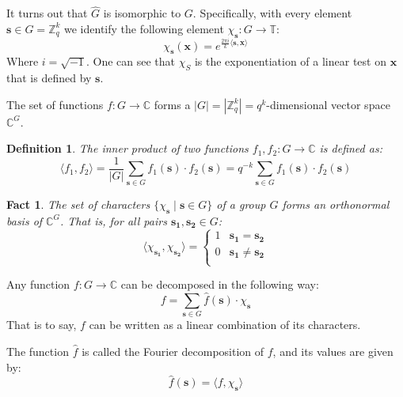 \documentclass[12pt]{article}
\newtheorem{definition}{Definition}[section]
\newtheorem{fact}[theorem]{Fact}
\newcommand{\C}{\mathbb{C}}
\renewcommand{\T}{\mathbb{T}}
\newcommand{\Z}{\mathbb{Z}}
\newcommand{\abs}[1]{\left| #1 \right|}
\renewcommand{\vec}[1]{\bm{#1}}
\begin{document}
	It turns out that $\hat{G}$ is isomorphic to $G$.
	Specifically, with every element $\vec{s} \in G = \Z_q^k$ we identify the following element $\chi_{\vec{s}} : G \rightarrow \T$:
	\begin{equation*}
		\chi_{\vec{s}}(\vec{x}) = e^{ \frac{2 \pi i}{k} \langle \vec{s}, \vec{x} \rangle }
	\end{equation*}
	Where $i = \sqrt{-1}$.
	One can see that $\chi_S$ is the exponentiation of a linear test on $\vec{x}$ that is defined by $\vec{s}$.
	
	The set of functions $f : G \rightarrow \C$ forms a $\abs{G} = \abs{\Z_q^k} = q^k$-dimensional vector space $\C^G$.
	\begin{definition}
		The \emph{inner product} of two functions $f_1, f_2 : G \rightarrow \C$ is defined as:
		\begin{equation*}
			\langle f_1, f_2 \rangle
			= \frac{1}{\abs{G}} \sum_{\vec{s} \in G} f_1(\vec{s}) \cdot f_2(\vec{s})
			= q^{-k} \sum_{\vec{s} \in G} f_1(\vec{s}) \cdot f_2(\vec{s})
		\end{equation*}
	\end{definition}
	
	\begin{fact}
		The set of characters $\{\chi_{\vec{s}} \mid \vec{s} \in G\}$ of a group $G$ forms an orthonormal basis of $\C^G$.
		That is, for all pairs $\vec{s_1}, \vec{s_2} \in G$:
		\begin{equation*}
			\langle \chi_{\vec{s_1}}, \chi_{\vec{s_2}} \rangle =
			\begin{cases}
				1 & \vec{s_1} = \vec{s_2} \\
				0 & \vec{s_1} \neq \vec{s_2} \\
			\end{cases}
		\end{equation*}
	\end{fact}
	
	Any function $f : G \rightarrow \C$ can be decomposed in the following way:
	\begin{equation*}
		f = \sum_{\vec{s} \in G} \hat{f}(\vec{s}) \cdot \chi_{\vec{s}}
	\end{equation*}
	That is to say, $f$ can be written as a linear combination of its characters.
	
	The function $\hat{f}$ is called the Fourier decomposition of $f$, and its values are given by:
	\begin{equation*}
		\hat{f}(\vec{s}) = \langle f, \chi_{\vec{s}} \rangle
	\end{equation*}
	
\end{document}
